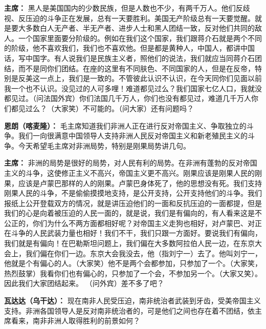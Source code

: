 \begin{list}{}
\item[\textbf{主席：}] 黑人是美国国内的少数民族，但是人数也不少，有两千万人。他们反歧视、反压迫的斗争正在发展，总有一天要胜利。美国无产阶级总有一天要觉醒。就是要大多数白人无产者、半无产者、进步人士和黑人团结一致，反对他们共同的敌人。一个国家里面要分阶级的。例如在我们这个国家，我们跟蒋介石就是两个不同的阶级，他不喜欢我们，我们也不喜欢他。但是都是黄种人，中国人，都讲中国话，写中国字。有人说我们是民族主义者，照他们的说法，我们就应当同蒋介石团结，而不是同你们团结。在座的这里有不同肤色、不同国家的人，但是在反帝，特别是反美这一点上，我们是一致的。不管彼此认识不认识，在今天同你们见面以前我一个也不认识。没见过的人可多哩！难道都见过么？我们国家七亿人口，我就没都见过。（问法国外宾）你们法国几千万人，你们也没有都见过，难道几千万人你们都见过么？（大家笑）不可能的。（问大家）还有问题吗？

\item[\textbf{恩朗（喀麦隆）：}] 毛主席知道我们非洲人正在进行反对帝国主义、争取独立的斗争。我们一向很满意中国领导人支持非洲人民反对帝国主义和新老殖民主义的斗争。今天希望毛主席对非洲局势，特别是刚果局势讲几句。

\item[\textbf{主席：}] 非洲的局势是很好的局势，对人民有利的局势。在非洲有蓬勃的反对帝国主义的斗争，这使修正主义不高兴，帝国主义更不高兴。刚果应该是刚果人民的刚果，应该是卢蒙巴那样的人的刚果。卢蒙巴身体死了，他的思想没有死。我们支持刚果人民的斗争，不是偷偷摸摸地支持，是公开支持，公开支持他们的斗争。我们报纸上公开登载双方的情况，就是讲压迫他们的一面和反抗压迫的一面都提，但是我们的心是向着被压迫的人民一面的，就是说，我们是有偏向的，有人看来这是不公正的，你们为什么不两方面都相好呢？对帝国主义走狗也相好，对卢蒙巴、对正在斗争的人民武装力量也相好！我们不干，我们只跟一方面好。要说我们有偏向，我们就是有偏向！在巴勒斯坦问题上，我们偏在大多数阿拉伯人民一边，在东京大会上，我们偏在你们一边。东京大会我没去，他（指刘宁一）去了。他叫刘宁一，他就是个有偏心的人。（大家笑）他不是两个会都参加，只参加了一个。（大家笑，热烈鼓掌）我看你们也有偏心的，只参加了一个会，不参加另一个。（大家又笑）。因此我们大家团结起来。 （问外宾）差不多了吧？

\item[\textbf{瓦达达（乌干达）：}] 现在南非人民受压迫，南非统治者武装到牙齿，受美帝国主义支持。非洲各国领导人是反对南非统治者的，可是他们之间也存在着不团结，依主席看来，南非非洲人取得胜利的前景如何？


\end{list}
